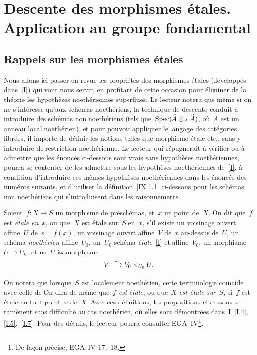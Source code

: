 \chapter[Descente des morphismes \'etales]{Descente des morphismes \'etales.\\ Application au groupe fondamental}
\label{IX}

\section{Rappels sur les morphismes \'etales}
\label{IX.1}

Nous allons ici passer en revue les propri\'et\'es des morphismes
\'etales (d\'evelopp\'es dans~\ref{I}) qui vont nous servir,
en profitant de cette occasion pour \'eliminer de la th\'eorie les
hypoth\`eses noeth\'eriennes superflues. Le lecteur notera que
m\^eme si on ne s'int\'eresse qu'aux sch\'emas noeth\'eriens, la
technique de descente conduit \`a introduire des sch\'emas non
noeth\'eriens (tels que~$\operatorname{Spec}(\widehat{A}\otimes_{A}\widehat{A})$,
o\`u~$A$ est un anneau local noeth\'erien), et pour pouvoir
appliquer le langage des cat\'egories fibr\'ees, il importe de
d\'efinir les notions telles que morphisme \'etale etc., sans y
introduire de restriction noeth\'erienne. Le lecteur qui
r\'epugnerait \`a v\'erifier ou \`a admettre que les
\'enonc\'es ci-dessous sont vrais sans hypoth\`eses
noeth\'eriennes, pourra se contenter de les admettre sous les
hypoth\`eses noeth\'eriennes de~\ref{I}, \`a condition
d'introduire ces m\^emes hypoth\`eses noeth\'eriennes dans les
\'enonc\'es des num\'eros suivants, et d'utiliser la
d\'efinition~\ref{IX.1.1} ci-dessous pour les sch\'emas non
noeth\'eriens qui s'introduisent dans les raisonnements.

\begin{definition}
\label{IX.1.1}
Soient~$f\colon X\to S$ un morphisme de pr\'esch\'emas, et~$x$ un
point de~$X$. On dit que~$f$ est \emph{étale en}~$x$,
ou que~$X$ est \'etale sur~$S$ en~$x$, s'il existe un voisinage
ouvert affine~$U$ de~$s=f(x)$, un voisinage ouvert affine~$V$ de~$x$
au-dessus de~$U$, un sch\'ema \emph{noethérien} affine~$U_{0}$,
un~$U_{0}$-sch\'ema \emph{étale}~\eqref{I} et affine~$V_{0}$, un
morphisme~$U\to U_{0}$, et un~$U$-isomorphisme
$$
V\overset{\sim}{\longrightarrow} V_{0}\times_{U_{0}}U.
$$
\end{definition}

On
notera que lorsque~$S$ est localement noeth\'erien, cette
terminologie co\"incide avec celle de \loccit On dira de m\^eme
que~$f$ \emph{est étale}, ou que~$X$ \emph{est étale sur}~$S$,
si~$f$ est \'etale en tout point~$x$ de~$X$. Avec ces
d\'efinitions, les propositions ci-dessous se ram\`enent sans
difficult\'e au cas noeth\'erien, o\`u elles sont
d\'emontr\'ees dans~I~\No \ref{I.4},
\ref{I.5},~\ref{I.7}. Pour des d\'etails, le lecteur pourra
consulter EGA~IV\footnote{De fa\c con pr\'ecise, EGA~IV 17,~18.}.

